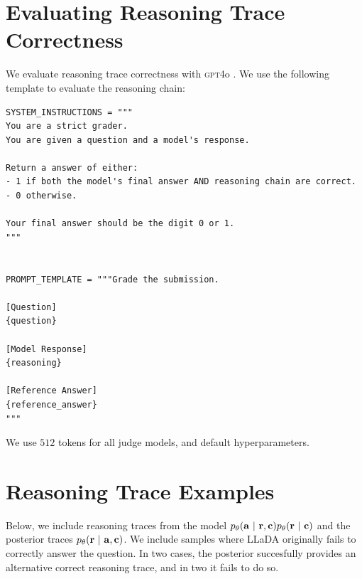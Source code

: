     



   









            


        


\section{Evaluating Reasoning Trace Correctness}\label{appsec:gpt4_prompt}

We evaluate reasoning trace correctness with \textsc{gpt4}o \citep{hurst2024gpt}. We use the following template to evaluate the reasoning chain:

\begin{verbatim}
SYSTEM_INSTRUCTIONS = """
You are a strict grader.
You are given a question and a model's response.

Return a answer of either:
- 1 if both the model's final answer AND reasoning chain are correct.
- 0 otherwise.

Your final answer should be the digit 0 or 1.
"""


PROMPT_TEMPLATE = """Grade the submission.

[Question]
{question}

[Model Response]
{reasoning}

[Reference Answer]
{reference_answer}
"""
\end{verbatim}

We use $512$ tokens for all judge models, and default hyperparameters.

\section{Reasoning Trace Examples}\label{appsec:posterior_traces}

Below, we include reasoning traces from the model $p_\theta(\mathbf{a} ~\vert~ \mathbf{r}, \mathbf{c}) p_\theta(\mathbf{r} ~\vert~ \mathbf{c})$ and the posterior traces $p_\theta(\mathbf{r} ~\vert~ \mathbf{a}, \mathbf{c})$. We include samples where LLaDA originally fails to correctly answer the question. In two cases, the posterior succesfully provides an alternative correct reasoning trace, and in two it fails to do so.

